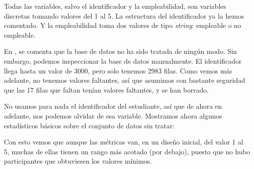 \documentclass[11pt]{article}
\begin{document}
Todas las variables, salvo el identificador y la empleabilidad, son variables discretas tomando valores del 1 al 5. La estructura del identificador ya la hemos comentado. Y la empleabilidad toma dos valores de tipo \textit{string}: empleable o no empleable.

En \cite{database:online}, se comenta que la base de datos no ha sido tratada de ningún modo. Sin embargo, podemos inspeccionar la base de datos manualmente. El identificador llega hasta un valor de 3000, pero solo tenemos 2983 filas. Como vemos más adelante, no tenemos valores faltantes, así que asumimos con bastante seguridad que las 17 filas que faltan tenían valores faltantes, y se han borrado.

No usamos para nada el identificador del estudiante, así que de ahora en adelante, nos podemos olvidar de esa variable. Mostramos ahora algunos estadísticos básicos sobre el conjunto de datos sin tratar:

\begin{table}[H]
\caption{Resumen del conjunto de datos original}
\end{table}

Con esto vemos que aunque las métricas van, en un diseño inicial, del valor 1 al 5, muchas de ellas tienen un rango más acotado (por debajo), puesto que no hubo participantes que obtuviesen los valores mínimos.
\end{document}
